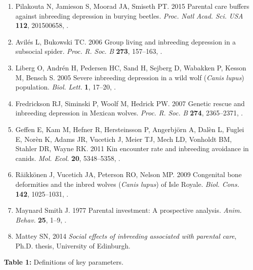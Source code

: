\documentclass[12pt]{article}
\begin{document}
\begin{enumerate}
\item{Pilakouta N, Jamieson S, Moorad JA, Smiseth PT. 2015 {Parental
  care buffers against inbreeding depression in burying beetles}.
  \textit{Proc. Natl Acad. Sci. USA} \textbf{112},
  201500658, .}

\item{Avil{\'{e}}s L, Bukowski TC. 2006 {Group living and inbreeding
  depression in a subsocial spider}. \textit{Proc. R. Soc. B}
  \textbf{273}, 157--163, .}

\item{Liberg O, Andr{\'{e}}n H, Pedersen HC, Sand H, Sejberg D, Wabakken P, 
  Kesson M, Bensch S. 2005 {Severe inbreeding depression in a wild
  wolf (\textit{Canis lupus}) population}. \textit{Biol. Lett.} \textbf{1}, 17--20,
  .}

\item{Fredrickson RJ, Siminski P, Woolf M, Hedrick PW. 2007 {Genetic
  rescue and inbreeding depression in Mexican wolves.} \textit{Proc. R. Soc. B} 
  \textbf{274}, 2365--2371, .}

\item{Geffen E, Kam M, Hefner R, Hersteinsson P, Angerbj{\"{o}}rn A,
  Dal{\`{e}}n L, Fuglei E, Nor{\`{e}}n K, Adams JR, Vucetich J,
  Meier TJ, Mech LD, Vonholdt BM, Stahler DR, Wayne RK.
  2011 {Kin encounter rate and inbreeding avoidance in canids}.
  \textit{Mol. Ecol.} \textbf{20}, 5348--5358,
  .}

\item{R{\"{a}}ikk{\"{o}}nen J, Vucetich JA, Peterson RO, Nelson MP.
  2009 {Congenital bone deformities and the inbred wolves (\textit{Canis lupus}) of Isle
  Royale}. \textit{Biol. Cons.} \textbf{142}, 1025--1031,
  .}

\item{Maynard Smith J. 1977 {Parental investment: A prospective analysis}.
  \textit{Anim. Behav.} \textbf{25}, 1--9,
  .}

\item{Mattey SN, 2014 \textit{{Social effects of inbreeding associated with
  parental care}}, Ph.D. thesis, University of Edinburgh.}

\end{enumerate}

\clearpage

\noindent \textbf{Table 1:}  Definitions of key parameters. \\
\end{document}
